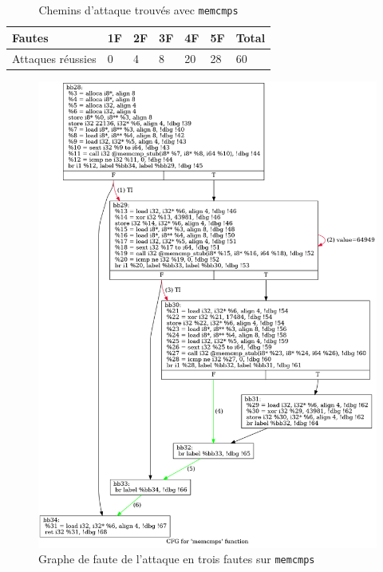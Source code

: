             \begin{table}[h]
                \caption{Chemins d'attaque trouvés avec \texttt{memcmps}}
                \label{tbl:memcmps-aa-results}
                \small
                \begin{center}
                    \begin{tabular}{l|llllll}
                    Fautes & 1F & 2F & 3F & 4F & 5F & Total \\
                    \hline
                    Attaques réussies & 0 & 4 & 8 & 20 & 28 & 60
                    \end{tabular}
                \end{center}
            \end{table}  
        
            \begin{figure}[!htp]\centering
                \includegraphics[scale=0.35]{ch3-lazart/img/cfg.memcmps.png}
                \caption{Graphe de faute de l'attaque en trois fautes sur \texttt{memcmps}}  \label{fig:memcmps-lazart-trace-graph}
            \end{figure}
        
